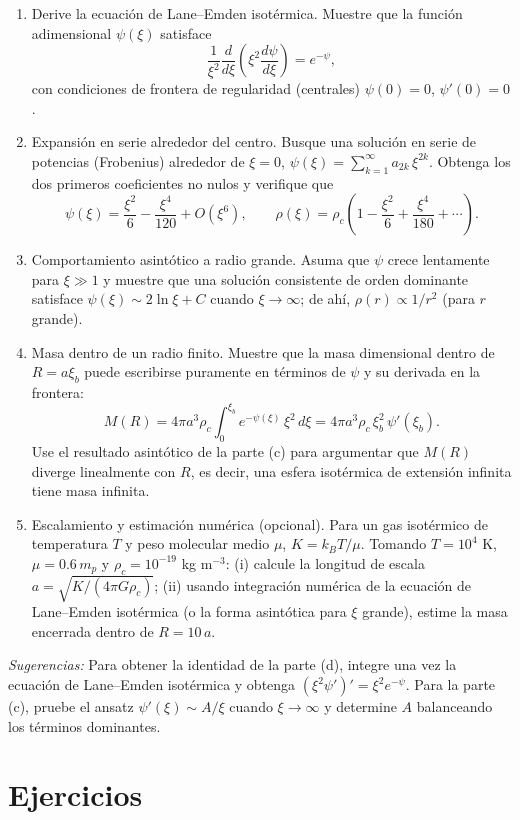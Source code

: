 \begin{enumerate}
\item[(a)] Derive la ecuación de Lane--Emden isotérmica. Muestre que la función adimensional $\psi(\xi)$ satisface
$$ \frac{1}{\xi^2}\frac{d}{d\xi}\left(\xi^2\frac{d\psi}{d\xi}\right) = e^{-\psi}, $$
con condiciones de frontera de regularidad (centrales) $\psi(0) = 0$, $\psi'(0) = 0$.
\item[(b)] Expansión en serie alrededor del centro. Busque una solución en serie de potencias (Frobenius) alrededor de $\xi = 0$, $\psi(\xi) = \sum_{k=1}^{\infty} a_{2k}\,\xi^{2k}$. Obtenga los dos primeros coeficientes no nulos y verifique que
$$ \psi(\xi) = \frac{\xi^2}{6} - \frac{\xi^4}{120} + O(\xi^6), \qquad \rho(\xi) = \rho_c\left(1 - \frac{\xi^2}{6} + \frac{\xi^4}{180} + \cdots\right). $$
\item[(c)] Comportamiento asintótico a radio grande. Asuma que $\psi$ crece lentamente para $\xi \gg 1$ y muestre que una solución consistente de orden dominante satisface $\psi(\xi) \sim 2\ln\xi + C$ cuando $\xi \to \infty$; de ahí, $\rho(r) \propto 1/r^2$ (para $r$ grande).
\item[(d)] Masa dentro de un radio finito. Muestre que la masa dimensional dentro de $R = a\xi_b$ puede escribirse puramente en términos de $\psi$ y su derivada en la frontera:
$$ M(R) = 4\pi a^3 \rho_c \int_0^{\xi_b} e^{-\psi(\xi)}\,\xi^2\,d\xi = 4\pi a^3 \rho_c\, \xi_b^2\, \psi'(\xi_b). $$
Use el resultado asintótico de la parte (c) para argumentar que $M(R)$ diverge linealmente con $R$, es decir, una esfera isotérmica de extensión infinita tiene masa infinita.
\item[(e)] Escalamiento y estimación numérica (opcional). Para un gas isotérmico de temperatura $T$ y peso molecular medio $\mu$, $K = k_B T/\mu$. Tomando $T = 10^4$ K, $\mu = 0.6\,m_p$ y $\rho_c = 10^{-19}$ kg m$^{-3}$: (i) calcule la longitud de escala $a = \sqrt{K/(4\pi G\rho_c)}$; (ii) usando integración numérica de la ecuación de Lane--Emden isotérmica (o la forma asintótica para $\xi$ grande), estime la masa encerrada dentro de $R = 10\,a$.
\end{enumerate}

\textit{Sugerencias:} Para obtener la identidad de la parte (d), integre una vez la ecuación de Lane--Emden isotérmica y obtenga $(\xi^2\psi')' = \xi^2 e^{-\psi}$. Para la parte (c), pruebe el ansatz $\psi'(\xi) \sim A/\xi$ cuando $\xi \to \infty$ y determine $A$ balanceando los términos dominantes.

\section{Ejercicios}


